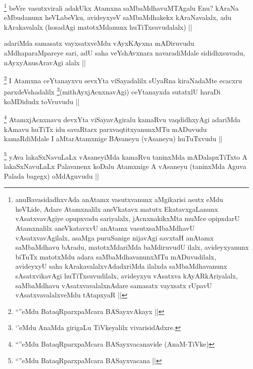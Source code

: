 \begin{artha}
\footnote{anuBavasidadhxvAda anAtamx vasutxvanunx aMgikarisi asutx eMdu heVLide, Adare Atamxnalilx aneVkatavx matutx EkatavxgaLanunx vAsatxvavAgiye opupxvadu sariyalalx, jAcnxnakikxMta muMce opipxdarU Atamxnalilx aneVkatavxvU anAtamx vasutxsaMbaMdhavU vAsatxvavAgilalx, asaMga puruSanige nijavAgi savxtaH anAtamx saMbaMdhavu bAradu, matotxMdariMda baMdiruvudU ilalx, avideyxyanunx biTuTx matotxMdu adara saMbaMdhavanunxMTu mADuvudilalx, avideyxyU saha kArakavalalxvAdadxriMda ilalxda saMbaMdhavanunx sAsatxvikavAgi huTiTxsuvudilalx, avideyxyu vAsatxva kAyARkAriyalalx, saMbaMdhavu vAsatxvavalalxnAdare samasatx vayxsatx rUpavU vAsatxvavalalxveMdu tAtapxyaR ||}
beVre vasutxvirali adakUkx Atamxna saMbaMdhavuMTAgalu Enu? kAraNa eMbudanunx heVLabeVku, avideyxyeV saMbaMdhakekx kAraNavalalx, adu kArakavalalx (hosadAgi matotxMdanunx huTiTxsuvudalalx) ||
\end{artha}

\begin{artha}
adariMda samasatx vayxsatxveMdu vAyxKAyxna mADiruvudu aMdhaparaMpareye sari, adU saha veYshAvxnara navaradiMdale sididhxsuvadu, nAyxyAnusAravAgi alalx ||
\end{artha}



\begin{artha}
\footnote{``\stext''eMdu BataqRparxpaMcara BASayxvAkayx ||}
I Atamxna ceYtanayxvu sevxYta viSayadalilx sUyaRna kiraNadaMte ecacxru parxdeVshadalilx \footnote{`\stext'eMdu AnaMda girigaLu TiVkeyalilx vivarisidAdxre.}(mithAyxjAcnxnavAgi) ceYtanayxda sutatxlU haraDi koMDidudx toVruvudu ||
\end{artha}

\begin{artha}
\footnote{``\stext''eMdu BataqRparxpaMcara BASayxvacanavide (AnaM-TiVke)}
AtamxjAcnxnavu devxYta viSayavAgiralu kamaRvu vaqdidhxyAgi adariMda kAmavu huTiTx idu savaRtarx parxvaqtitxyanunxMTu mADuvudu kamaRdiMdale I aMtarAtamxnige BAvaneyu (vAsaneyu) huTuTxvudu ||
\end{artha}


\begin{artha}
\footnote{``\stext''eMdu BataqRparxpaMcara BASayxvacana ||}
yAva lakaSxNavuLaLx vAsaneyiMda kamaRvu taninxMda mADalapxTiTxto A lakaSxNavuLaLx Palavanenx koDalu Atamxnige A vAsaneyu (taninxMda Aguva Palada bagegx) oMdAguvudu ||
\end{artha}

